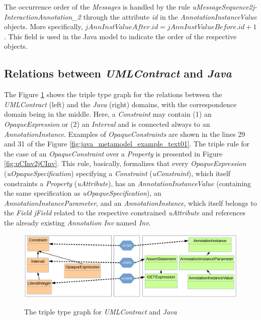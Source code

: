 \documentclass[tuberlin,cic,tc,english,noabntcite,oneside]{iiufrgs}
\begin{document}
The occurrence order of the \emph{Messages} is handled by the rule \emph{uMessageSequence2j- InteractionAnnotation\_2} through the attribute \emph{id} in the \emph{AnnotationInstanceValue} objects.
More specifically, $jAnnInstValueAfter.id = jAnnInstValueBefore.id + 1$. This field is used in the Java model to indicate the order of the respective objects.


\subsection{Relations between \emph{UMLContract} and \emph{Java}}
\label{subsec:UmlContracts2Java}

The Figure \ref{fig:umlContract2java_type} shows the triple type graph for the relations between the \emph{UMLContract} (left) and the \emph{Java} (right) domains, with the correspondence domain being in the middle. Here, a \emph{Constraint} may contain (1) an \emph{OpaqueExpression} or (2) an \emph{Interval} and is connected always to an \emph{AnnotationInstance}. Examples of \emph{OpaqueConstraints} are shown in the lines 29 and 31 of the Figure \ref{fig:java_metamodel_example_text01}. The triple rule for the case of an \emph{OpaqueConstraint} over a \emph{Property} is presented in Figure \ref{fig:uCInv2jCInv}. This rule, basically, formalizes that every \emph{OpaqueExpression} (\emph{uOpaqueSpecification}) specifying a \emph{Constraint} (\emph{uConstraint}), which itself constraints a \emph{Property} (\emph{uAttribute}), has an \emph{AnnotationInstanceValue} (containing the same specification as \emph{uOpaqueSpecification}), an \emph{AnnotationInstanceParameter}, and an \emph{AnnotationInstance}, which itself belongs to the \emph{Field} \emph{jField} related to the respective constrained \emph{uAttribute} and references the already existing \emph{Annotation} \emph{Inv} named \emph{Inv}.

\begin{figure}[H]
    \centering
    \caption{The triple type graph for \emph{UMLContract} and \emph{Java}}
    \includegraphics[width=.7\textwidth]{umlContract2java_type}
    \label{fig:umlContract2java_type}
\end{figure}
\end{document}
